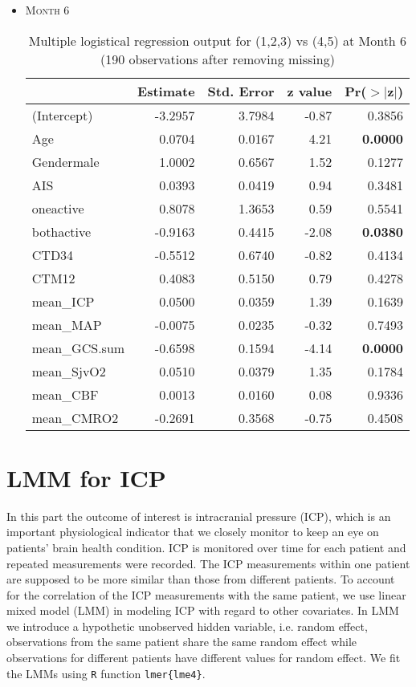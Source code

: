 \documentclass{article}
\begin{document}
\begin{itemize}
\item \textsc{Month 6}
\begin{table}[H]
\centering
\begin{tabular}{lrrrr}
  \hline
 & Estimate & Std. Error & z value & Pr($>$$|$z$|$) \\ 
  \hline
(Intercept) & -3.2957 & 3.7984 & -0.87 & 0.3856 \\ 
  Age & 0.0704 & 0.0167 & 4.21 & {\bf 0.0000} \\ 
  Gendermale & 1.0002 & 0.6567 & 1.52 & 0.1277 \\ 
  AIS & 0.0393 & 0.0419 & 0.94 & 0.3481 \\ 
  oneactive & 0.8078 & 1.3653 & 0.59 & 0.5541 \\ 
  bothactive & -0.9163 & 0.4415 & -2.08 & {\bf 0.0380} \\ 
  CTD34 & -0.5512 & 0.6740 & -0.82 & 0.4134 \\ 
  CTM12 & 0.4083 & 0.5150 & 0.79 & 0.4278 \\ 
  mean\_ICP & 0.0500 & 0.0359 & 1.39 & 0.1639 \\ 
  mean\_MAP & -0.0075 & 0.0235 & -0.32 & 0.7493 \\ 
  mean\_GCS.sum & -0.6598 & 0.1594 & -4.14 & {\bf 0.0000} \\ 
  mean\_SjvO2 & 0.0510 & 0.0379 & 1.35 & 0.1784 \\ 
  mean\_CBF & 0.0013 & 0.0160 & 0.08 & 0.9336 \\ 
  mean\_CMRO2 & -0.2691 & 0.3568 & -0.75 & 0.4508 \\ 
   \hline
\end{tabular}
\caption{Multiple logistical regression output for (1,2,3) vs (4,5) at Month 6 (190 observations after removing missing)}
\end{table}

\end{itemize}






\newpage
\section{LMM for ICP}
In this part the outcome of interest is intracranial pressure (ICP), which is an important physiological indicator that we closely monitor to keep an eye on patients' brain health condition. ICP is monitored over time for each patient and repeated measurements were recorded. The ICP measurements within one patient are supposed to be more similar than those from different patients. To account for the correlation of the ICP measurements with the same patient, we use linear mixed model (LMM) in modeling ICP with regard to other covariates. In LMM we introduce a hypothetic unobserved hidden variable, i.e. random effect, observations from the same patient share the same random effect while observations for different patients have different values for random effect. We fit the LMMs using \verb'R' \cite{team2012r} function \verb'lmer{lme4}'\cite{bates2012lme4}.
\end{document}
